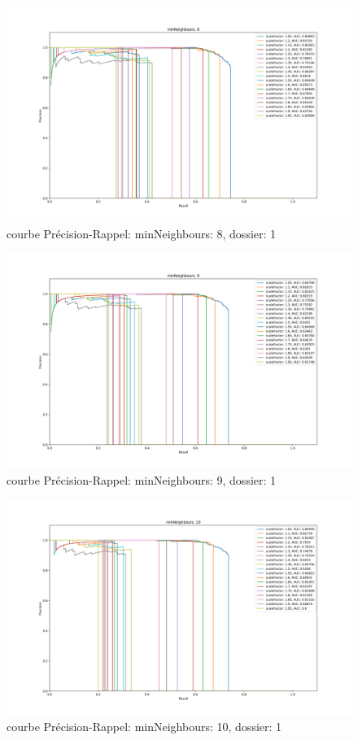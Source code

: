 \documentclass[a4paper,11pt]{article}
\begin{document}
	\begin{figure}[H]
	    \begin{center}
		\includegraphics[scale = 0.4]{images/courbes/folder_01_minN_8.png}
		\caption{courbe Précision-Rappel: minNeighbours: 8, dossier: 1}
		\label{fig:minN_2}
	    \end{center}
	\end{figure}

	\begin{figure}[H]
	    \begin{center}
		\includegraphics[scale = 0.4]{images/courbes/folder_01_minN_9.png}
		\caption{courbe Précision-Rappel: minNeighbours: 9, dossier: 1}
		\label{fig:minN_2}
	    \end{center}
	\end{figure}

	\begin{figure}[H]
	    \begin{center}
		\includegraphics[scale = 0.4]{images/courbes/folder_01_minN_10.png}
		\caption{courbe Précision-Rappel: minNeighbours: 10, dossier: 1}
		\label{fig:minN_2}
	    \end{center}
	\end{figure}
\end{document}
